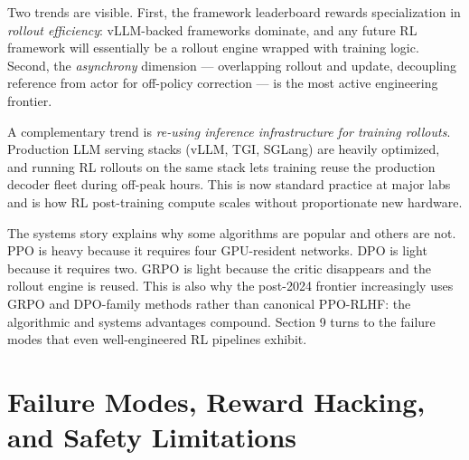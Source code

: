 Two trends are visible. First, the framework leaderboard rewards specialization in \emph{rollout efficiency}: vLLM-backed frameworks dominate, and any future RL framework will essentially be a rollout engine wrapped with training logic. Second, the \emph{asynchrony} dimension --- overlapping rollout and update, decoupling reference from actor for off-policy correction --- is the most active engineering frontier.

A complementary trend is \emph{re-using inference infrastructure for training rollouts}. Production LLM serving stacks (vLLM, TGI, SGLang) are heavily optimized, and running RL rollouts on the same stack lets training reuse the production decoder fleet during off-peak hours. This is now standard practice at major labs and is how RL post-training compute scales without proportionate new hardware.

The systems story explains why some algorithms are popular and others are not. PPO is heavy because it requires four GPU-resident networks. DPO is light because it requires two. GRPO is light because the critic disappears and the rollout engine is reused. This is also why the post-2024 frontier increasingly uses GRPO and DPO-family methods rather than canonical PPO-RLHF: the algorithmic and systems advantages compound. Section 9 turns to the failure modes that even well-engineered RL pipelines exhibit.

\section{Failure Modes, Reward Hacking, and Safety Limitations}\label{failure-modes-reward-hacking-and-safety-limitations}

